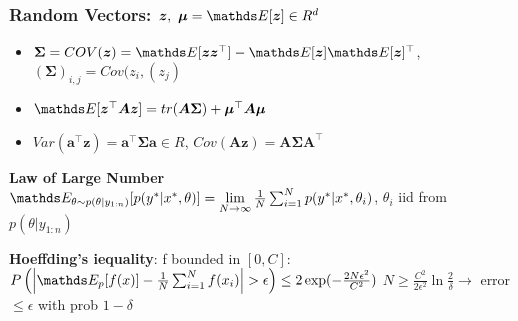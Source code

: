 \subsubsection{Random Vectors: $\bm{z},\ \bm{\mu}= \E {\bm{z}} \in R^{d}$}
\begin{itemize}
    \item $\bm{\Sigma} = COV(\bm{z}) = \E {\bm{z}\bm{z}^{\top}} - \E {\bm{z}} \E {\bm{z}}^{\top}$,
    $(\bm{\Sigma})_{i,j} = Cov(z_{i}, (z_{j})$
    \item $\E {\bm{z}^{\top}\bm{A}\bm{z}} = tr(\bm{A}\bm{\Sigma}) + \bm{\mu}^{\top}\bm{A}\bm{\mu}$
    \item $Var(\bm{a}^{\top}\bm{z}) = \bm{a}^{\top}\bm{\Sigma}\bm{a} \in R$, $Cov(\bm{A}\bm{z}) = \bm{A}\bm{\Sigma}\bm{A}^{\top}$
\end{itemize}


%
%
%
%


\textbf{Law of Large Number}
$\E[\theta \sim p(\theta|y_{1:n})]{p(y^{*}|x^{*}, \theta)} =
\lim\limits_{N \to \infty} \frac{1}{N} \sum_{i=1}^{N}p(y^{*}|x^{*}, \theta_{i})$, $\theta_{i}$ iid from $p(\theta|y_{1:n})$

\textbf{Hoeffding's iequality}: f bounded in $\left[0,C\right]$: $P\bb{\abs{\E[p]{f(x)}-\frac{1}{N}
\sum_{i=1}^{N}f(x_{i})} > \epsilon} \leq 2\exp(-\frac{2N\epsilon^{2}}{C^2})$
$N \geq \frac{C^2}{2\epsilon^2}\ln{\frac{2}{\delta}} \rightarrow$ error $\leq \epsilon$ with prob $1 - \delta$



